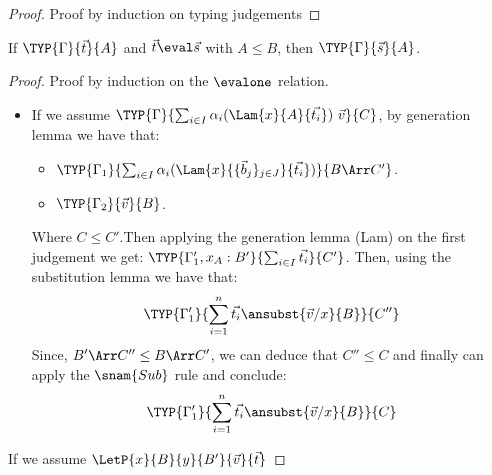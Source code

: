 \begin{proof}
    Proof by induction on typing judgements
\end{proof}

\begin{theorem}
    If $\TYP{\Gamma}{\vec{t}}{A}$ and $\vec{t}\eval\vec{s}$ with $A\leq B$, then $\TYP{\Gamma}{\vec{s}}{A}$.
\end{theorem}

\begin{proof}
    Proof by induction on the $\evalone$ relation.
    \begin{itemize}
        \item If we assume $\TYP{\Gamma}{\sum_{i\in I}\alpha_i(\Lam{x}{A}{\vec{t_i}})\ \vec{v}}{C}$, by {\color{red}generation lemma} we have that:
        \begin{itemize}
            \item $\TYP{\Gamma_1}{\sum_{i\in I}\alpha_i(\Lam{x}{\{\vec b_j\}_{j\in J}}{\vec{t_i}})}{B\Arr C'}$.
            \item $\TYP{\Gamma_2}{\vec{v}}{B}$.
        \end{itemize}
        Where $C\leq C'$.Then applying the generation lemma (Lam) on the first judgement we get: $\TYP{\Gamma'_1, x_A:B'}{\sum_{i\in I}\vec{t_i}}{C'}$. Then, using the substitution lemma we have that:
        \[\TYP{\Gamma'_1}{\sum_{i=1}^{n}\vec{t_i}\ansubst{\vec{v}/x}{B}}{C''}\]
        Since, $B'\Arr C''\leq B\Arr C'$, we can deduce that $C''\leq C$ and finally can apply the $\snam{Sub}$ rule and conclude:
        \[\TYP{\Gamma'_1}{\sum_{i=1}^{n}\vec{t_i}\ansubst{\vec{v}/x}{B}}{C}\]
        \end{itemize}

        \item If we assume $\LetP{x}{B}{y}{B'}{\vec v}{\vec{t}}$
\end{proof}